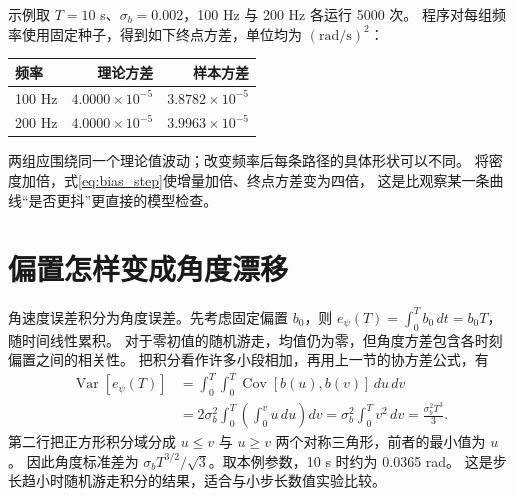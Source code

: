 \begin{center}\begin{minipage}{\linewidth}\makeatletter{}\makeatother
\centering
{}
\caption{独立试验终点的示意。每条折线使用不同增量序列；同一路径上各时刻共享历史，适合研究时间相关性。}
\end{minipage}\end{center}

示例取 $T=10$ s、$\sigma_b=0.002$，100 Hz 与 200 Hz 各运行 5000 次。
程序对每组频率使用固定种子，得到如下终点方差，单位均为 $(\mathrm{rad/s})^2$：
\begin{center}\begin{tabular}{lrr}\toprule
频率 & 理论方差 & 样本方差\\\midrule
100 Hz & $4.0000\times10^{-5}$ & $3.8782\times10^{-5}$\\
200 Hz & $4.0000\times10^{-5}$ & $3.9963\times10^{-5}$\\\bottomrule
\end{tabular}\end{center}
两组应围绕同一个理论值波动；改变频率后每条路径的具体形状可以不同。
将密度加倍，式\eqref{eq:bias_step}使增量加倍、终点方差变为四倍，
这是比观察某一条曲线“是否更抖”更直接的模型检查。

\section{偏置怎样变成角度漂移}
角速度误差积分为角度误差。先考虑固定偏置 $b_0$，则
$e_\psi(T)=\int_0^T b_0\,dt=b_0T$，随时间线性累积。
对于零初值的随机游走，均值仍为零，但角度方差包含各时刻偏置之间的相关性。
把积分看作许多小段相加，再用上一节的协方差公式，有
\begin{align*}
 \operatorname{Var}[e_\psi(T)]
 &=\int_0^T\int_0^T\operatorname{Cov}[b(u),b(v)]\,du\,dv\\
 &=2\sigma_b^2\int_0^T\left(\int_0^v u\,du\right)dv
 =\sigma_b^2\int_0^T v^2\,dv
 =\frac{\sigma_b^2T^3}{3}.
\end{align*}
第二行把正方形积分域分成 $u\le v$ 与 $u\ge v$ 两个对称三角形，前者的最小值为 $u$。
因此角度标准差为 $\sigma_bT^{3/2}/\sqrt3$。取本例参数，10 s 时约为 0.0365 rad。
这是步长趋小时随机游走积分的结果，适合与小步长数值实验比较。


